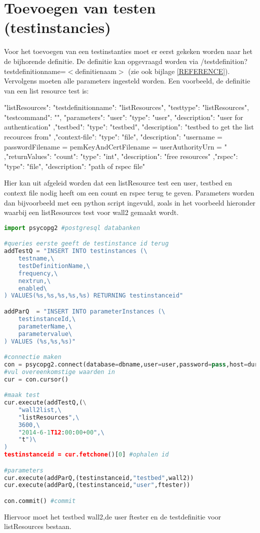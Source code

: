 \section{Toevoegen van testen (testinstancies)}
\npar
Voor het toevoegen van een testinstanties moet er eerst gekeken worden naar het de bijhorende definitie. De definitie kan opgevraagd worden via /testdefinition?testdefinitionname=$<$definitienaam$>$ (zie ook bijlage \ref{REFERENCE}). Vervolgens moeten alle parameters ingesteld worden. 
\npar 
Een voorbeeld, de definitie van een list resource test is:
\begin{lt}
    "listResources": {
        "testdefinitionname": "listResources",
        "testtype": "listResources",
        "testcommand": "",
        "parameters": {
            "user": {
                "type": "user",
                "description": "user for authentication"
            },"testbed": {
                "type": "testbed",
                "description": "testbed to get the list recources from"
            },"context-file": {
                "type": "file",
                "description": "username = \n    passwordFilename = \n    pemKeyAndCertFilename = \n    userAuthorityUrn = "
            }
        },"returnValues": {
            "count": {
                "type": "int",
                "description": "free resources"
            },"rspec": {
                "type": "file",
                "description": "path of rspec file"
            }
        }
    }
\end{lt}
\npar 
Hier kan uit afgeleid worden dat een listResource test een user, testbed en context file nodig heeft om een count en rspec terug te geven. Parameters worden dan bijvoorbeeld met een python script ingevuld, zoals in het voorbeeld hieronder waarbij een listResources test voor wall2 gemaakt wordt.
\clearpage
\begin{lstlisting}[language=Python]
import psycopg2 #postgresql databanken

#queries eerste geeft de testinstance id terug
addTestQ = "INSERT INTO testinstances (\
	testname,\
	testDefinitionName,\
	frequency,\
	nextrun,\
	enabled\
) VALUES(%s,%s,%s,%s,%s) RETURNING testinstanceid"

addParQ  = "INSERT INTO parameterInstances (\
	testinstanceId,\
	parameterName,\
	parametervalue\
) VALUES (%s,%s,%s)"

#connectie maken
con = psycopg2.connect(database=dbname,user=user,password=pass,host=durl) 
#vul overeenkomstige waarden in
cur = con.cursor()

#maak test
cur.execute(addTestQ,(\
	"wall2list,\
	"listResources",\
	3600,\
	"2014-6-1T12:00:00+00",\
	"t")\
)
testinstanceid = cur.fetchone()[0] #ophalen id

#parameters
cur.execute(addParQ,(testinstanceid,"testbed",wall2))	
cur.execute(addParQ,(testinstanceid,"user",ftester))

con.commit() #commit
\end{lstlisting}
\npar
Hiervoor moet het testbed wall2,de user ftester en de testdefinitie voor listResources bestaan.

